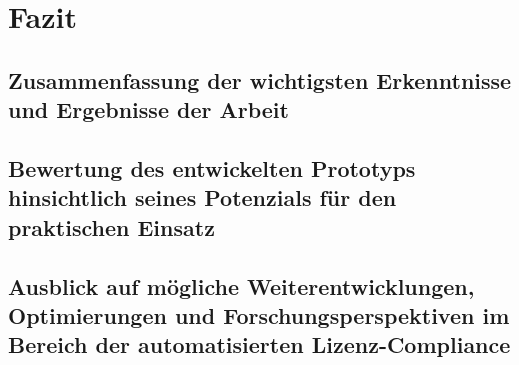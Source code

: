 \chapter{Fazit}\label{ch:fazit}

\section{Zusammenfassung der wichtigsten Erkenntnisse und Ergebnisse der Arbeit}

\section{Bewertung des entwickelten Prototyps hinsichtlich seines Potenzials für den
praktischen Einsatz}

\section{Ausblick auf mögliche Weiterentwicklungen, Optimierungen und
Forschungsperspektiven im Bereich der automatisierten Lizenz-Compliance}
